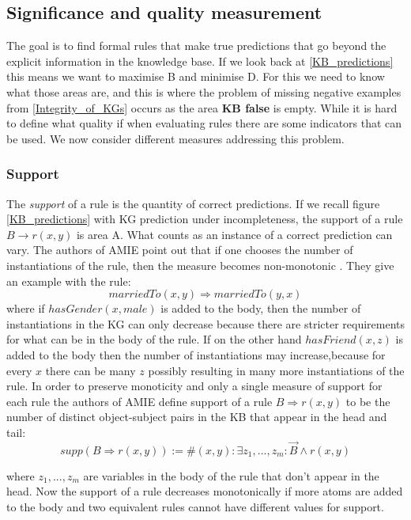 \subsection{Significance and quality measurement}
\label{significance_and_quality}
The goal is to find formal rules that make true predictions that go beyond the explicit information in the knowledge base. If we look back at \cref{KB_predictions} this means we want to maximise B and minimise D. For this we need to know what those areas are, and this is where the problem of missing negative examples from \cref{Integrity_of_KGs} occurs as the area \textbf{KB false} is empty. While it is hard to define what quality if when evaluating rules there are some indicators that can be used. We now consider different measures addressing this problem.

\subsubsection{Support}
The \textit{support} of a rule is the quantity of correct predictions. If we recall figure \cref{KB_predictions} with KG prediction under incompleteness, the support of a rule $B \rightarrow r(x,y)$ is area A. What counts as an instance of a correct prediction can vary. The authors of AMIE point out that if one chooses the number of instantiations of the rule, then the measure becomes non-monotonic \cite{amie3}. They give an example with the rule:
\[marriedTo(x, y) \Rightarrow marriedTo(y, x)\]
where if $hasGender(x, male)$ is added to the body, then the number of instantiations in the KG can only decrease because there are stricter requirements for what can be in the body of the rule. If on the other hand $hasFriend(x, z)$ is added to the body then the number of instantiations may increase,because for every $x$ there can be many $z$ possibly resulting in many more instantiations of the rule. In order to preserve monoticity and only a single measure of support for each rule the authors of AMIE define support of a rule $B\Rightarrow r(x, y)$ to be the number of distinct object-subject pairs in the KB that appear in the head and tail:
\[supp(B\Rightarrow r(x, y)) :=  \# (x, y) : \exists z_1 , ...,z_m : \vec{B} \wedge r(x, y)\]

where $z_1, ..., z_m$ are variables in the body of the rule that don't appear in the head. Now the support of a rule decreases monotonically if more atoms are added to the body and two equivalent rules cannot have different values for support.

